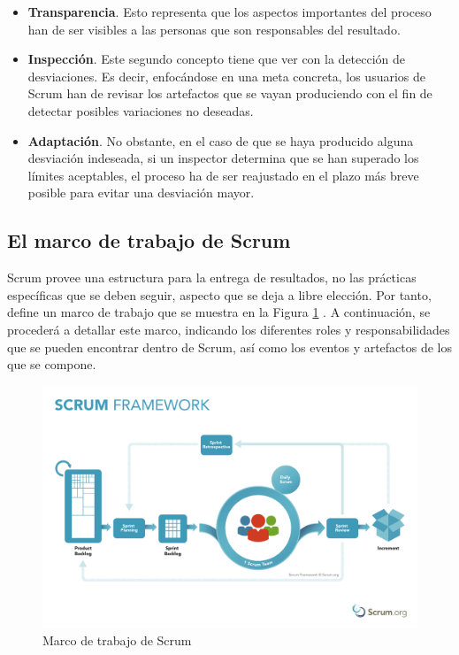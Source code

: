 \begin{itemize}
    \item \textbf{Transparencia}. Esto representa que los aspectos importantes del proceso han de ser visibles a las personas que son responsables del resultado.
    \item \textbf{Inspección}. Este segundo concepto tiene que ver con la detección de desviaciones. Es decir, enfocándose en una meta concreta, los usuarios de Scrum han de revisar los artefactos que se vayan produciendo con el fin de detectar posibles variaciones no deseadas.
    \item \textbf{Adaptación}. No obstante, en el caso de que se haya producido alguna desviación indeseada, si un inspector determina que se han superado los límites aceptables, el proceso ha de ser reajustado en el plazo más breve posible para evitar una desviación mayor.
\end{itemize}

\subsection{El marco de trabajo de Scrum}
Scrum provee una estructura para la entrega de resultados, no las prácticas específicas que se deben seguir, aspecto que se deja a libre elección. Por tanto, define un marco de trabajo que se muestra en la Figura \ref{fig:scrum_framework} \cite{scrumframewok}. A continuación, se procederá a detallar este marco, indicando los diferentes roles y responsabilidades que se pueden encontrar dentro de Scrum, así como los eventos y artefactos de los que se compone.

\begin{figure}[h]
  \centering
  \includegraphics[width=0.8\linewidth]{figures/images/ScrumFramework.pdf}
  \caption{Marco de trabajo de Scrum}
  \label{fig:scrum_framework}
\end{figure}

